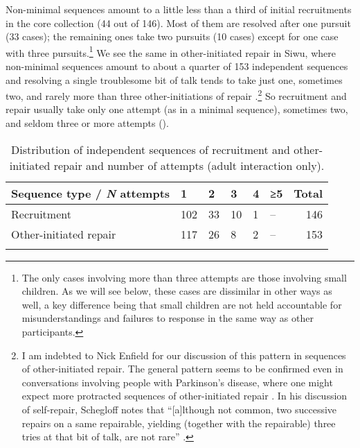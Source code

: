 \documentclass[output=paper]{langsci/langscibook}
\begin{document}
Non-minimal sequences amount to a little less than a third of initial recruitments in the core collection (44 out of 146). Most of them are resolved after one pursuit (33 cases); the remaining ones take two pursuits (10 cases) except for one case with three pursuits.\footnote{The only cases involving more than three attempts are those involving small children. As we will see below, these cases are dissimilar in other ways as well, a key difference being that small children are not held accountable for misunderstandings and failures to response in the same way as other participants.} We see the same in other-initiated repair in Siwu, where non-minimal sequences amount to about a quarter of 153 independent sequences and resolving a single troublesome bit of talk tends to take just one, sometimes two, and rarely more than three other-initiations of repair \citep{dingemanse_other-initiated_2015}.\footnote{I am indebted to Nick Enfield for our discussion of this pattern in sequences of other-initiated repair. The general pattern seems to be confirmed even in conversations involving people with Parkinson’s disease, where one might expect more protracted sequences of other-initiated repair \citep{GriffithsEtAl2015}. In his discussion of self-repair, Schegloff notes that “[a]lthough not common, two successive repairs on a same repairable, yielding (together with the repairable) three tries at that bit of talk, are not rare” \citep[277]{schegloff_relevance_1979}.}  So recruitment and repair usually take only one attempt (as in a minimal sequence), sometimes two, and seldom three or more attempts ().

\begin{table}
\begin{tabularx}{\textwidth}{Xlllllr}
\lsptoprule
Sequence type / \textit{N} attempts & 1 & 2 & 3 & 4 & ≥5 & Total \\
\midrule
Recruitment & 102 & 33 & 10 & 1 & -- & 146\\
Other-initiated repair & 117 & 26 & 8 & 2 & -- & 153\\
\lspbottomrule
\end{tabularx}
\caption{Distribution of independent sequences of recruitment and other-initiated repair and number of attempts (adult interaction only).}
\label{tab:dingemanse:6}
\end{table}
\end{document}
